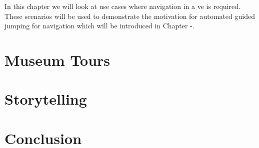 \label{chapter:Guided Jumping Scenarios}
In this chapter we will look at use cases where navigation in a \acrshort{ve} is required. These scenarios will be used to demonstrate the motivation for automated guided jumping for navigation which will be introduced in Chapter -. 

\section{Museum Tours}
\label{section:GJS Museum Tours}

\section{Storytelling}
\label{section:GJS Storytelling}

\section{Conclusion}
\label{section:GJS Conclusion}